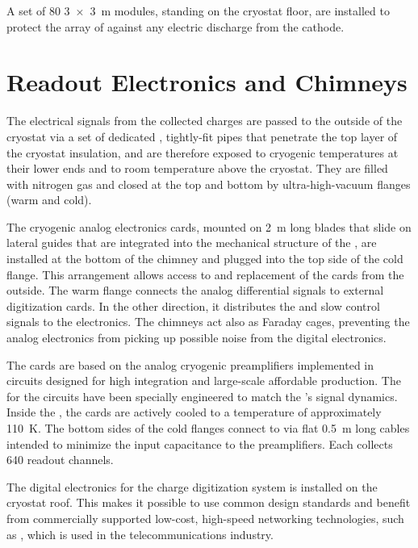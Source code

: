 A set of 80 \SI{3x3}{m}  modules, standing on the cryostat floor, are installed to protect the array of  against any electric discharge from the cathode.




\section{Readout Electronics and Chimneys}
\label{sec:dp-execsum-electronics}

The electrical signals from the collected charges are passed to the outside of the cryostat via a set of dedicated , tightly-fit pipes that penetrate the top layer of the cryostat insulation, and are therefore exposed to cryogenic temperatures at their lower ends and to room temperature above the cryostat. They are filled with nitrogen gas and closed at the top and  bottom by ultra-high-vacuum flanges (warm and cold).  

The cryogenic analog  electronics cards, mounted on \SI{2}{m} long blades that slide on lateral guides that are integrated into the mechanical structure of the , are installed at the bottom of the chimney and plugged into the top side of the cold flange. 
This arrangement allows access to and replacement of the cards from the outside. 
 The warm flange connects the analog differential signals to external digitization cards. In the other direction, it distributes the  and slow control signals to the  electronics.  The chimneys act also as Faraday cages, preventing the analog  electronics  from picking up possible noise from the digital electronics.   
 
The  cards are based on the analog cryogenic preamplifiers implemented in   circuits designed for high integration and large-scale affordable production. 
The  for the  circuits have been specially engineered to match the 's signal dynamics. Inside the , the cards are actively cooled to a temperature of approximately \SI{110}{K}.  The bottom sides of the cold flanges connect to   via flat \SI{0.5}{m} long cables intended to minimize the input capacitance to the preamplifiers. Each  collects \num{640} readout channels. 

The digital electronics for the charge digitization system is installed on the cryostat roof. 
This makes it possible to use common design standards and benefit from commercially supported low-cost, high-speed networking technologies, such as , which is used in the telecommunications industry.

